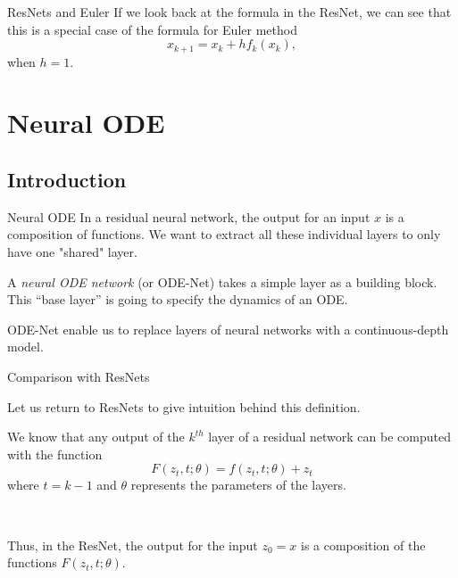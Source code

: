 \documentclass[11pt]{beamer}
\begin{document}
\begin{frame}{ResNets and Euler}
If we look back at the formula in the ResNet, we can see
that this is a special case of the formula for Euler method
\begin{equation*}
x_{k+1} = x_k + hf_k(x_k),
\end{equation*}
when $h = 1$.

\end{frame}



\section{Neural ODE} \label{neuralode}
\subsection{Introduction}

\begin{frame}{Neural ODE}
In a residual neural network, the output for an input $x$ is a composition of functions. We want to extract all these individual layers to only have one "shared" layer.

\begin{definition}
A \textit{neural ODE network} (or ODE-Net) \cite{2,3,12} takes a simple layer as a building block. This “base layer” is going to specify the dynamics of an ODE.

\end{definition}
ODE-Net enable us to replace layers of neural networks with a continuous-depth model.
\end{frame}
\begin{frame}{Comparison with ResNets}

Let us return to ResNets to give intuition behind this definition. 

We know that any output of the $k^{th}$ layer of a residual network can be computed with the function
\begin{equation*}
F(z_t, t; \theta) = f(z_t, t;\theta) + z_t
\end{equation*}
where $t = k - 1$ and $\theta$ represents the parameters of the layers.

~

Thus, in the ResNet, the output for the input $z_0 = x$ is a composition of the functions $F(z_t, t; \theta)$.
\end{frame}
\end{document}
